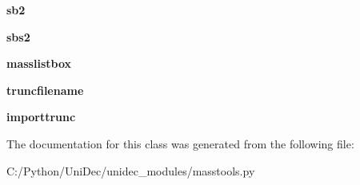 \begin{DoxyCompactItemize}
\item 
\hypertarget{class_uni_dec_1_1unidec__modules_1_1masstools_1_1_manual_selection_acb954f944d813061d6a6b1ccc88f3f2a}{}{\bfseries sb2}\label{class_uni_dec_1_1unidec__modules_1_1masstools_1_1_manual_selection_acb954f944d813061d6a6b1ccc88f3f2a}

\item 
\hypertarget{class_uni_dec_1_1unidec__modules_1_1masstools_1_1_manual_selection_a15eabff84b80ceb78c9f7a24fc8251ae}{}{\bfseries sbs2}\label{class_uni_dec_1_1unidec__modules_1_1masstools_1_1_manual_selection_a15eabff84b80ceb78c9f7a24fc8251ae}

\item 
\hypertarget{class_uni_dec_1_1unidec__modules_1_1masstools_1_1_manual_selection_a328068d2fa772319a373db9d06dfe69f}{}{\bfseries masslistbox}\label{class_uni_dec_1_1unidec__modules_1_1masstools_1_1_manual_selection_a328068d2fa772319a373db9d06dfe69f}

\item 
\hypertarget{class_uni_dec_1_1unidec__modules_1_1masstools_1_1_manual_selection_ac6b3bee1a9cd50fef00c7a62ef964f88}{}{\bfseries truncfilename}\label{class_uni_dec_1_1unidec__modules_1_1masstools_1_1_manual_selection_ac6b3bee1a9cd50fef00c7a62ef964f88}

\item 
\hypertarget{class_uni_dec_1_1unidec__modules_1_1masstools_1_1_manual_selection_a7d86dd8a171faf5c7d081741c2f0d691}{}{\bfseries importtrunc}\label{class_uni_dec_1_1unidec__modules_1_1masstools_1_1_manual_selection_a7d86dd8a171faf5c7d081741c2f0d691}

\end{DoxyCompactItemize}


The documentation for this class was generated from the following file\+:\begin{DoxyCompactItemize}
\item 
C\+:/\+Python/\+Uni\+Dec/unidec\+\_\+modules/masstools.\+py\end{DoxyCompactItemize}
